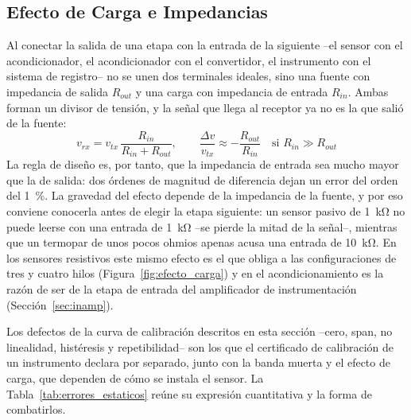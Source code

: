 \subsection{Efecto de Carga e Impedancias}\label{sub:efecto_carga_general}

Al conectar la salida de una etapa con la entrada de la siguiente --el sensor con el acondicionador, el acondicionador con el convertidor, el instrumento con el sistema de registro-- no se unen dos terminales ideales, sino una fuente con impedancia de salida $R_{out}$ y una carga con impedancia de entrada $R_{in}$. Ambas forman un divisor de tensión, y la señal que llega al receptor ya no es la que salió de la fuente:
\begin{equation}\label{eq:error_carga}
    v_{rx} = v_{tx}\,\frac{R_{in}}{R_{in} + R_{out}}, \qquad \frac{\Delta v}{v_{tx}} \approx -\frac{R_{out}}{R_{in}} \quad \text{si } R_{in} \gg R_{out}
\end{equation}
La regla de diseño es, por tanto, que la impedancia de entrada sea mucho mayor que la de salida: dos órdenes de magnitud de diferencia dejan un error del orden del \SI{1}{\percent}. La gravedad del efecto depende de la impedancia de la fuente, y por eso conviene conocerla antes de elegir la etapa siguiente: un sensor pasivo de \SI{1}{\kilo\ohm} no puede leerse con una entrada de \SI{1}{\kilo\ohm} --se pierde la mitad de la señal--, mientras que un termopar de unos pocos ohmios apenas acusa una entrada de \SI{10}{\kilo\ohm}. En los sensores resistivos este mismo efecto es el que obliga a las configuraciones de tres y cuatro hilos (Figura~\ref{fig:efecto_carga}) y en el acondicionamiento es la razón de ser de la etapa de entrada del amplificador de instrumentación (Sección~\ref{sec:inamp}).

Los defectos de la curva de calibración descritos en esta sección --cero, span, no linealidad, histéresis y repetibilidad-- son los que el certificado de calibración de un instrumento declara por separado, junto con la banda muerta y el efecto de carga, que dependen de cómo se instala el sensor. La Tabla~\ref{tab:errores_estaticos} reúne su expresión cuantitativa y la forma de combatirlos.

